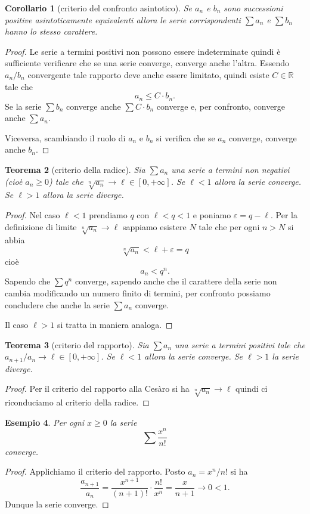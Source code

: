 \documentclass[italian,a4paper,oneside,headinclude]{scrbook}
\newcommand{\eps}{\varepsilon}
\newcommand{\RR}{\mathbb R}
\newtheorem{theorem}{Teorema}
\newtheorem{corollary}[theorem]{Corollario}
\newtheorem{example}[theorem]{Esempio}
\begin{document}
\begin{corollary}[criterio del confronto asintotico]
Se $a_n$ e $b_n$ sono successioni positive
asintoticamente equivalenti
allora le serie corrispondenti $\sum a_n$ e $\sum b_n$
hanno lo stesso carattere.
\end{corollary}
%
\begin{proof}
Le serie a termini positivi non possono essere indeterminate
quindi è sufficiente verificare che se una serie converge, converge anche l'altra.
Essendo $a_n / b_n$ convergente tale rapporto deve anche essere
limitato, quindi esiste $C\in \RR$ tale che
\[
   a_n \le C \cdot b_n.
\]
Se la serie $\sum b_n$ converge anche $\sum C \cdot b_n$ converge e, per confronto,
converge anche $\sum a_n$.

Viceversa, scambiando il ruolo di $a_n$ e $b_n$ si verifica che se $a_n$
converge, converge anche $b_n$.
\end{proof}

\begin{theorem}[criterio della radice]
Sia $\sum a_n$ una serie a termini non negativi
(cioè $a_n\ge 0$) tale che
$\sqrt[n]{a_n} \to \ell \in [0,+\infty]$.
Se $\ell<1$ allora la serie converge.
Se $\ell>1$ allora la serie diverge.
\end{theorem}
%
\begin{proof}
Nel caso $\ell < 1$
prendiamo $q$ con $\ell < q < 1$ e poniamo $\eps = q-\ell$.
Per la definizione di limite $\sqrt[n]{a_n}\to \ell$ sappiamo
esistere $N$ tale che per ogni $n > N$ si abbia
\[
  \sqrt[n]{a_n} < \ell + \eps = q
\]
cioè
\[
   a_n < q^n.
\]
Sapendo che $\sum q^n$ converge, sapendo anche che il carattere
della serie non cambia modificando un numero finito di termini,
per confronto possiamo concludere che anche la serie $\sum a_n$ converge.

Il caso $\ell > 1$ si tratta in maniera analoga.
\end{proof}

\begin{theorem}[criterio del rapporto]
Sia $\sum a_n$ una serie a termini positivi
tale che $a_{n+1} / a_n \to \ell \in [0,+\infty]$.
Se $\ell <1$ allora la serie converge.
Se $\ell > 1$ la serie diverge.
\end{theorem}
%
\begin{proof}
Per il criterio del rapporto alla Cesàro si ha $\sqrt[n]{a_n} \to \ell$
quindi ci riconduciamo al criterio della radice.
\end{proof}

\begin{example}
Per ogni $x\ge 0$ la serie
\[
  \sum \frac{x^n}{n!}
\]
converge.
\end{example}
%
\begin{proof}
Applichiamo il criterio del rapporto. Posto $a_n = x^n / n!$ si ha
\[
\frac{a_{n+1}}{a_n}
= \frac{x^{n+1}}{(n+1)!}\cdot \frac{n!}{x^n}
= \frac{x}{n+1} \to 0 < 1.
\]
Dunque la serie converge.
\end{proof}
\end{document}
